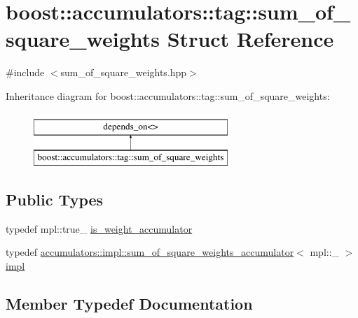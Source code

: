 \hypertarget{structboost_1_1accumulators_1_1tag_1_1sum__of__square__weights}{}\section{boost\+:\+:accumulators\+:\+:tag\+:\+:sum\+\_\+of\+\_\+square\+\_\+weights Struct Reference}
\label{structboost_1_1accumulators_1_1tag_1_1sum__of__square__weights}


{\ttfamily \#include $<$sum\+\_\+of\+\_\+square\+\_\+weights.\+hpp$>$}

Inheritance diagram for boost\+:\+:accumulators\+:\+:tag\+:\+:sum\+\_\+of\+\_\+square\+\_\+weights\+:\begin{figure}[H]
\begin{center}
\leavevmode
\includegraphics[height=2.000000cm]{structboost_1_1accumulators_1_1tag_1_1sum__of__square__weights}
\end{center}
\end{figure}
\subsection*{Public Types}
\begin{DoxyCompactItemize}
\item 
typedef mpl\+::true\+\_\+ \hyperlink{structboost_1_1accumulators_1_1tag_1_1sum__of__square__weights_aa1b4145dd1d30517a31fc2b139a4d831}{is\+\_\+weight\+\_\+accumulator}
\item 
typedef \hyperlink{structboost_1_1accumulators_1_1impl_1_1sum__of__square__weights__accumulator}{accumulators\+::impl\+::sum\+\_\+of\+\_\+square\+\_\+weights\+\_\+accumulator}$<$ mpl\+::\+\_ $>$ \hyperlink{structboost_1_1accumulators_1_1tag_1_1sum__of__square__weights_a1b17755b77e02ad2286bcace0dcb9109}{impl}
\end{DoxyCompactItemize}


\subsection{Member Typedef Documentation}
\hypertarget{structboost_1_1accumulators_1_1tag_1_1sum__of__square__weights_a1b17755b77e02ad2286bcace0dcb9109}{}
